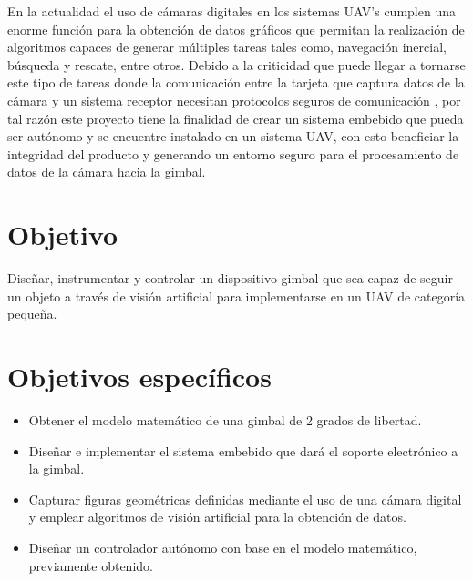 En la actualidad el uso de cámaras digitales en los sistemas UAV’s cumplen una enorme función para la obtención de datos gráficos que permitan la realización de algoritmos capaces de generar múltiples tareas tales como, navegación inercial, búsqueda y rescate, entre otros. Debido a la criticidad que puede llegar a tornarse este tipo de tareas donde la comunicación entre la tarjeta que captura datos de la cámara y un sistema receptor necesitan protocolos seguros de comunicación , por tal razón este proyecto tiene la finalidad de crear un sistema embebido que pueda ser autónomo y se encuentre instalado en un sistema UAV, con esto beneficiar la integridad del producto y generando un entorno seguro para el procesamiento de datos de la cámara hacia la gimbal.
\section{Objetivo}

Diseñar, instrumentar y controlar un dispositivo gimbal que sea capaz de seguir un objeto a través de visión artificial para implementarse en un UAV de categoría pequeña.

\section{Objetivos específicos}
\begin{itemize}
\item Obtener el modelo matemático de una gimbal de 2 grados de libertad.
\item Diseñar e implementar el sistema embebido que dará el soporte electrónico a la gimbal.
\item Capturar figuras geométricas definidas  mediante el uso de una cámara digital y emplear algoritmos de visión artificial para la obtención de datos. 
\item Diseñar un controlador autónomo con base en el modelo matemático, previamente obtenido.
\end{itemize}


